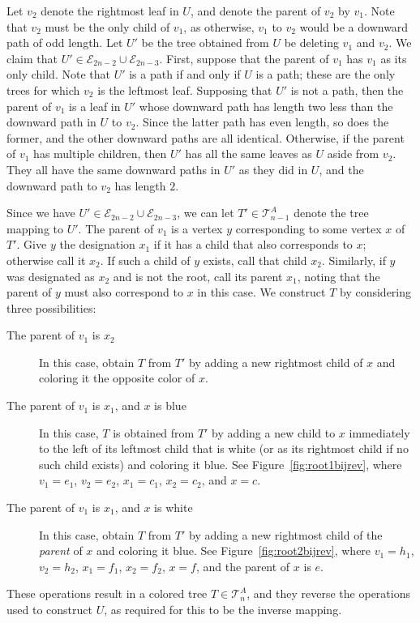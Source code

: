 \documentclass[12pt]{amsart}
\begin{document}
\begin{description}
    Let $v_2$ denote the rightmost leaf in $U$, and denote the parent of $v_2$ by $v_1$. Note that $v_2$ must be the only child of $v_1$, as otherwise, $v_1$ to $v_2$ would be a downward path of odd length. Let $U'$ be the tree obtained from $U$ be deleting $v_1$ and $v_2$. We claim that $U'\in\mathcal{E}_{2n-2}\cup\mathcal{E}_{2n-3}$. First, suppose that the parent of $v_1$ has $v_1$ as its only child. Note that $U'$ is a path if and only if $U$ is a path; these are the only trees for which $v_2$ is the leftmost leaf. Supposing that $U'$ is not a path, then the parent of $v_1$ is a leaf in $U'$ whose downward path has length two less than the downward path in $U$ to $v_2$. Since the latter path has even length, 
    so does the former, and the other downward paths are all identical. Otherwise, if the parent of $v_1$ has multiple children, then $U'$ has all the same leaves as $U$ aside from $v_2$. They all have the same downward paths in $U'$ as they did in $U$, and the downward path to $v_2$ has length $2$.
    
    
    

    Since we have $U'\in\mathcal{E}_{2n-2}\cup\mathcal{E}_{2n-3}$, we can let $T'\in\mathcal{T}_{n-1}^A$ denote the tree mapping to $U'$. The parent of $v_1$ is a vertex $y$ corresponding to some vertex $x$ of $T'$.
    Give $y$ the designation $x_1$ if it has a child that also corresponds to $x$; otherwise call it $x_2$. If such a child of $y$ exists, call that child $x_2$. Similarly, if $y$ was designated as $x_2$ and is not the root, call its parent $x_1$, noting that the parent of $y$ must also correspond to $x$ in this case.
    We construct $T$ by considering three possibilities:
    \begin{description}
        \item[The parent of $v_1$ is $x_2$] In this case, obtain $T$ from $T'$ by adding a new rightmost child of $x$ and coloring it the opposite color of $x$.
        \item[The parent of $v_1$ is $x_1$, and $x$ is blue] In this case, $T$ is obtained from $T'$ by adding a new child to $x$ immediately to the left of its leftmost child that is white (or as its rightmost child if no such child exists) and coloring it blue. See 
        Figure~\ref{fig:root1bijrev}, where $v_1=e_1$, $v_2=e_2$, $x_1=c_1$, $x_2=c_2$, and $x=c$.
        \item[The parent of $v_1$ is $x_1$, and $x$ is white] In this case, obtain $T$ from $T'$ by adding a new rightmost child of the \emph{parent} of $x$ and coloring it blue. See Figure~\ref{fig:root2bijrev}, where $v_1=h_1$, $v_2=h_2$, $x_1=f_1$, $x_2=f_2$, $x=f$, and the parent of $x$ is $e$.
    \end{description}
    These operations result in a 
    colored tree $T\in\mathcal{T}_n^A$, and they reverse the operations used to construct $U$, as required for this to be the inverse mapping.
    

\end{description}
\end{document}

